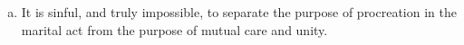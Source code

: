 \begin{enumerate}
\begin{enumerate}[i.]
\begin{enumerate}[a.]
				\item It is sinful, and truly impossible, to separate the purpose of procreation in the marital act from the purpose of mutual care and unity.
			\end{enumerate}
	\end{enumerate}
\end{enumerate}